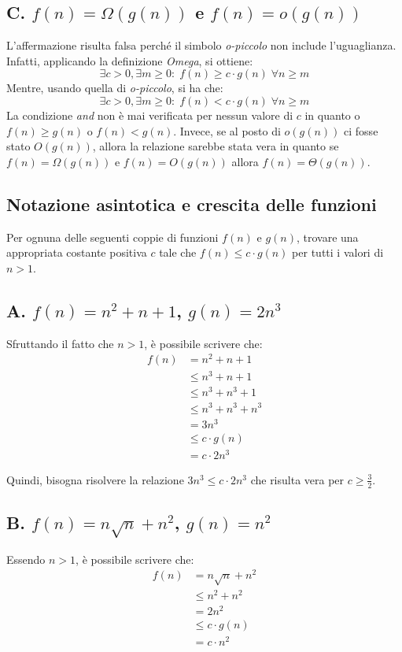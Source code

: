 \documentclass{article}
\begin{document}
\subsection*{C. $f(n) = \Omega(g(n))$ e $f(n) = o(g(n))$}
L'affermazione risulta falsa perché il simbolo \textit{o-piccolo} non include l'uguaglianza. Infatti, applicando la definizione \textit{Omega}, si ottiene:
\begin{equation*}
    \exists c > 0, \exists m \geq 0: \; f(n)\geq c\cdot g(n)\; \forall n\geq m
\end{equation*}
Mentre, usando quella di \textit{o-piccolo}, si ha che:
\begin{equation*}
    \exists c > 0, \exists m \geq 0: \; f(n) < c \cdot g(n)\; \forall n\geq m
\end{equation*}
La condizione \textit{and} non è mai verificata per nessun valore di $c$ in quanto o $f(n) \geq g(n)$ o $f(n) < g(n)$.
Invece, se al posto di $o(g(n))$ ci fosse stato $O(g(n))$, allora la relazione sarebbe stata vera in quanto se $f(n) = \Omega (g(n))$ e $f(n) = O(g(n))$ allora $f(n) = \Theta(g(n))$.

\clearpage
\subsection{Notazione asintotica e crescita delle funzioni}
Per ognuna delle seguenti coppie di funzioni $f(n)$ e $g(n)$, trovare una appropriata costante positiva $c$ tale che $f(n) \leq c \cdot g(n)$ per tutti i valori di $n > 1$.

\subsection*{A. $f(n) = n^2 + n + 1$, $g(n) = 2n^3$}
Sfruttando il fatto che $n > 1$, è possibile scrivere che:
\begin{align*}
    f(n) &= n^2 + n + 1\\
  &\leq n^3 + n + 1\\
  &\leq n^3 + n^3 + 1\\
  &\leq n^3 + n^3 + n^3\\
  &= 3n^3\\
  &\leq c\cdot g(n) \\
  &=c \cdot 2n^3
\end{align*}

Quindi, bisogna risolvere la relazione $3n^3 \leq c \cdot 2n^3$ che risulta vera per $c \geq \frac{3}{2}$.

\subsection*{B. $f(n) = n\sqrt{n} + n^2$, $g(n) = n^2$}
Essendo $n > 1$, è possibile scrivere che:
\begin{align*}
    f(n) &= n\sqrt{n} + n^2\\
  &\leq n^2 + n^2\\
  &= 2n^2\\
  &\leq c\cdot g(n) \\
  &=c \cdot n^2
\end{align*}
\end{document}
